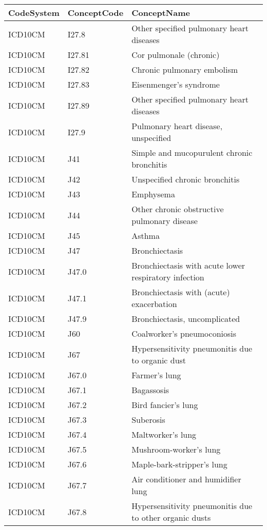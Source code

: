 \begin{table}[ht]
\centering
\begin{tabular}{lll}
  \hline
CodeSystem & ConceptCode & ConceptName \\ 
  \hline
ICD10CM & I27.8 & Other specified pulmonary heart diseases \\ 
  ICD10CM & I27.81 & Cor pulmonale (chronic) \\ 
  ICD10CM & I27.82 & Chronic pulmonary embolism \\ 
  ICD10CM & I27.83 & Eisenmenger's syndrome \\ 
  ICD10CM & I27.89 & Other specified pulmonary heart diseases \\ 
  ICD10CM & I27.9 & Pulmonary heart disease, unspecified \\ 
  ICD10CM & J41 & Simple and mucopurulent chronic bronchitis \\ 
  ICD10CM & J42 & Unspecified chronic bronchitis \\ 
  ICD10CM & J43 & Emphysema \\ 
  ICD10CM & J44 & Other chronic obstructive pulmonary disease \\ 
  ICD10CM & J45 & Asthma \\ 
  ICD10CM & J47 & Bronchiectasis \\ 
  ICD10CM & J47.0 & Bronchiectasis with acute lower respiratory infection \\ 
  ICD10CM & J47.1 & Bronchiectasis with (acute) exacerbation \\ 
  ICD10CM & J47.9 & Bronchiectasis, uncomplicated \\ 
  ICD10CM & J60 & Coalworker's pneumoconiosis \\ 
  ICD10CM & J67 & Hypersensitivity pneumonitis due to organic dust \\ 
  ICD10CM & J67.0 & Farmer's lung \\ 
  ICD10CM & J67.1 & Bagassosis \\ 
  ICD10CM & J67.2 & Bird fancier's lung \\ 
  ICD10CM & J67.3 & Suberosis \\ 
  ICD10CM & J67.4 & Maltworker's lung \\ 
  ICD10CM & J67.5 & Mushroom-worker's lung \\ 
  ICD10CM & J67.6 & Maple-bark-stripper's lung \\ 
  ICD10CM & J67.7 & Air conditioner and humidifier lung \\ 
  ICD10CM & J67.8 & Hypersensitivity pneumonitis due to other organic dusts \\ 

\end{tabular}
\end{table}
